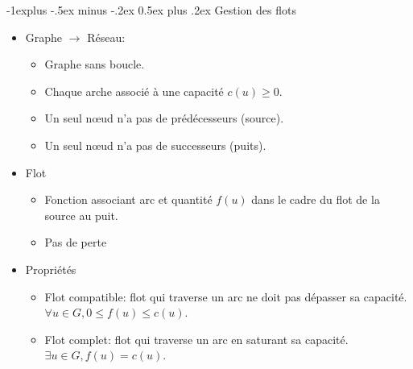 \documentclass[10pt,landscape]{article}
\makeatletter
\renewcommand{\subsection}{\@startsection{subsection}{2}{0mm}%
                                {-1explus -.5ex minus -.2ex}%
                                {0.5ex plus .2ex}%
                                {\normalfont\normalsize\bfseries}}
\makeatother
\begin{document}
\begin{multicols}{3}
  \subsection{Gestion des flots}
    \begin{itemize}
      \item Graphe $\rightarrow$ Réseau:
        \begin{itemize}
          \item Graphe sans boucle.
          \item Chaque arche associé à une capacité $c(u) \ge 0$.
          \item Un seul n\oe ud n'a pas de prédécesseurs (source).
          \item Un seul n\oe ud n'a pas de successeurs (puits).
        \end{itemize}
      \item Flot
        \begin{itemize}
          \item Fonction associant arc et quantité $f(u)$ dans le cadre du flot de la source au puit.
          \item Pas de perte
        \end{itemize}
      \item Propriétés
        \begin{itemize}
          \item Flot compatible: flot qui traverse un arc ne doit pas dépasser sa capacité. $\forall u \in G, 0 \le f(u) \le c(u)$.
          \item Flot complet: flot qui traverse un arc en saturant sa capacité. $\exists u \in G, f(u) = c(u)$.
        \end{itemize}
    \end{itemize}

\end{multicols}
\end{document}
